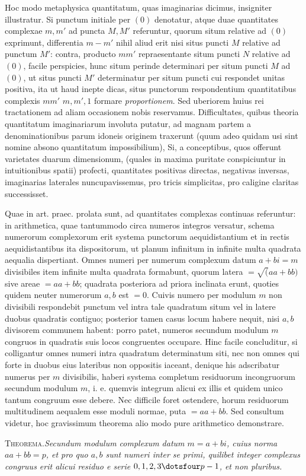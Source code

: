 Hoc modo metaphysica quantitatum, quas imaginarias dicimus, insigniter illustratur. Si punctum initiale per $(0)$ denotatur, atque duae quantitates complexae $m,m'$ ad puncta $M,M'$ referuntur, quorum situm relative ad $(0)$ exprimunt, differentia $m-m'$ nihil aliud erit nisi situs puncti $M$ relative ad punctum $M'$: contra, producto $mm'$ repraesentante situm puncti $N$ relative ad $(0)$, facile perspicies, hunc situm perinde determinari per situm puncti $M$ ad $(0)$, ut situs puncti $M'$ determinatur per situm puncti cui respondet unitas positiva, ita ut haud inepte dicas, situs punctorum respondentium quantitatibus complexis $mm'$
%
$m,m',1$ formare \emph{proportionem}. Sed uberiorem huius rei tractationem ad aliam occasionem nobis reservamus. Difficultates, quibus theoria quantitatum imaginariarum involuta putatur, ad magnam partem a denominationibus parum idoneis originem traxerunt (quum adeo quidam usi sint nomine absono quantitatum impossibilium), Si, a conceptibus, quos offerunt varietates duarum dimensionum, (quales in maxima puritate conspiciuntur in intuitionibus spatii) profecti, quantitates positivas directas, negativas inversas, imaginarias laterales nuncupavissemus, pro tricis simplicitas, pro caligine claritas successisset.

Quae in art. praec. prolata sunt, ad quantitates complexas continuas referuntur: in arithmetica, quae tantummodo circa numeros integros versatur, schema numerorum complexorum erit systema punctorum aequidistantium et in rectis aequidistantibus ita dispositorum, ut planum infinitum in infinite multa quadrata aequalia dispertiant. Omnes numeri per numerum complexum datum $a+bi=m$ divisibiles item infinite multa quadrata formabunt, quorum latera $=\surd(aa+bb)$ sive areae $=aa+bb$; quadrata posteriora ad priora inclinata erunt, quoties quidem neuter numerorum $a,b$ est $=0$. Cuivis numero per modulum $m$ non divisibili respondebit punctum vel intra tale quadratum situm vel in latere duobus quadratis contiguo; posterior tamen casus locum habere nequit, nisi $a,b$ divisorem communem habent: porro patet, numeros secundum modulum $m$ congruos in quadratis suis locos congruentes occupare. Hinc facile concluditur, si colligantur omnes numeri intra quadratum determinatum siti, nec non omnes qui forte in duobus eius lateribus non oppositis iaceant, denique his adscribatur numerus per $m$ divisibilis, haberi systema completum residuorum incongruorum secundum modulum $m$, i. e. quemvis integrum alicui ex illis et quidem unico tantum congruum esse debere. Nec difficile foret ostendere, horum residuorum multitudinem aequalem esse moduli normae, puta $=aa+bb$. Sed consultum videtur, hoc gravissimum theorema alio modo pure arithmetico demonstrare.

\textsc{Theorema.}\quad\emph{Secundum modulum complexum datum $m=a+bi$, cuius norma $aa+bb=p$, et pro quo $a,b$ sunt numeri inter se primi, quilibet integer complexus congruus erit alicui residuo e serie $0,1,2,3\dotsfour p-1$, et non pluribus.}

